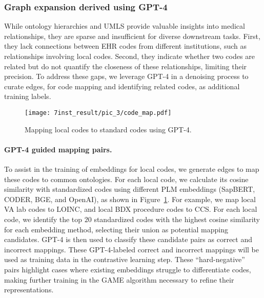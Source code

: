 \documentclass{article}
\begin{document}
\subsubsection{Graph expansion derived using GPT-4}
\label{sec:GPT}

While ontology hierarchies and UMLS provide valuable insights into medical relationships, they are sparse and insufficient for diverse downstream tasks. First, they lack connections between EHR codes from different institutions, such as relationships involving local codes. Second, they indicate whether two codes are related but do not quantify the closeness of these relationships, limiting their precision. To address these gaps, we leverage GPT-4 in a denoising process to curate edges, for code mapping and identifying related codes, as additional training labels.

\begin{figure}[!ht]
    \centering
    \texttt{[image: 7inst\_result/pic\_3/code\_map.pdf]} 
    \caption{Mapping local codes to standard codes using GPT-4.}
    \label{fig:map-codes-gpt4}
\end{figure}

\paragraph{GPT-4 guided mapping pairs.} 
To assist in the training of embeddings for local codes, we generate edges to map these codes to common ontologies. For each local code, we calculate its cosine similarity with standardized codes using different PLM embeddings (SapBERT, CODER, BGE, and OpenAI), as shown in Figure~\ref{fig:map-codes-gpt4}. For example, we map local VA lab codes to LOINC, and local BDX procedure codes to CCS. For each local code, we identify the top $20$ standardized codes with the highest cosine similarity for each embedding method, selecting their union as potential mapping candidates. GPT-4 is then used to classify these candidate pairs as correct and incorrect mappings. These GPT-4-labeled correct and incorrect mappings will be used as training data in the contrastive learning step. These ``hard-negative''  pairs highlight cases where existing embeddings struggle to differentiate codes, making further training in the GAME algorithm necessary to refine their representations. 
\end{document}
